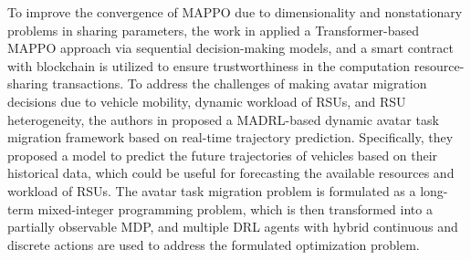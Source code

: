  To improve the convergence of MAPPO due to dimensionality and nonstationary problems in sharing parameters, the work in \cite{10415630} applied a Transformer-based MAPPO approach via sequential decision-making models, and a smart contract with blockchain is utilized to ensure trustworthiness in the computation resource-sharing transactions.  To address the challenges of making avatar migration decisions due to vehicle mobility, dynamic workload of RSUs, and RSU heterogeneity, the authors in \cite{10185562} proposed a MADRL-based dynamic avatar task migration framework based on real-time trajectory prediction. Specifically, they proposed a model to predict the future trajectories of vehicles based on their historical data, which could be useful for forecasting the available resources and workload of RSUs. The avatar task migration problem is formulated as a long-term mixed-integer programming problem, which is then transformed into a partially observable MDP, and multiple DRL agents with hybrid continuous and discrete actions are used to address the formulated optimization problem.

